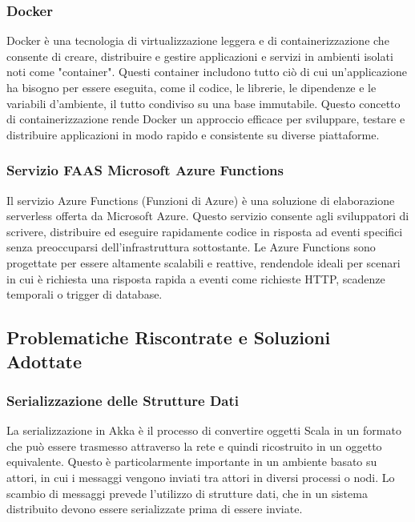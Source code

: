 \documentclass[12pt]{article}
\begin{document}
\subsubsection{Docker}

Docker è una tecnologia di virtualizzazione leggera e di containerizzazione che consente di creare, distribuire e gestire applicazioni e servizi in ambienti isolati noti come "container". Questi container includono tutto ciò di cui un'applicazione ha bisogno per essere eseguita, come il codice, le librerie, le dipendenze e le variabili d'ambiente, il tutto condiviso su una base immutabile. Questo concetto di containerizzazione rende Docker un approccio efficace per sviluppare, testare e distribuire applicazioni in modo rapido e consistente su diverse piattaforme.

\subsubsection{Servizio FAAS Microsoft Azure Functions}

Il servizio Azure Functions (Funzioni di Azure) è una soluzione di elaborazione serverless offerta da Microsoft Azure. Questo servizio consente agli sviluppatori di scrivere, distribuire ed eseguire rapidamente codice in risposta ad eventi specifici senza preoccuparsi dell'infrastruttura sottostante. Le Azure Functions sono progettate per essere altamente scalabili e reattive, rendendole ideali per scenari in cui è richiesta una risposta rapida a eventi come richieste HTTP, scadenze temporali o trigger di database.

\subsection{Problematiche Riscontrate e Soluzioni Adottate}

\subsubsection{Serializzazione delle Strutture Dati}

La serializzazione in Akka è il processo di convertire oggetti Scala in un formato che può essere trasmesso attraverso la rete e quindi ricostruito in un oggetto equivalente. Questo è particolarmente importante in un ambiente basato su attori, in cui i messaggi vengono inviati tra attori in diversi processi o nodi. Lo scambio di messaggi prevede l'utilizzo di strutture dati, che in un sistema distribuito devono essere serializzate prima di essere inviate.
\end{document}
